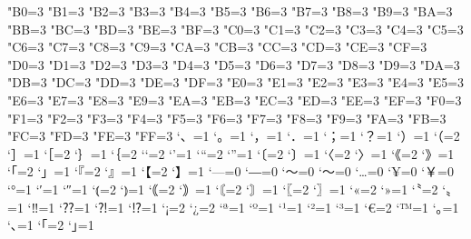 \xspcode"B0=3
\xspcode"B1=3
\xspcode"B2=3
\xspcode"B3=3
\xspcode"B4=3
\xspcode"B5=3
\xspcode"B6=3
\xspcode"B7=3
\xspcode"B8=3
\xspcode"B9=3
\xspcode"BA=3
\xspcode"BB=3
\xspcode"BC=3
\xspcode"BD=3
\xspcode"BE=3
\xspcode"BF=3
\xspcode"C0=3
\xspcode"C1=3
\xspcode"C2=3
\xspcode"C3=3
\xspcode"C4=3
\xspcode"C5=3
\xspcode"C6=3
\xspcode"C7=3
\xspcode"C8=3
\xspcode"C9=3
\xspcode"CA=3
\xspcode"CB=3
\xspcode"CC=3
\xspcode"CD=3
\xspcode"CE=3
\xspcode"CF=3
\xspcode"D0=3
\xspcode"D1=3
\xspcode"D2=3
\xspcode"D3=3
\xspcode"D4=3
\xspcode"D5=3
\xspcode"D6=3
\xspcode"D7=3
\xspcode"D8=3
\xspcode"D9=3
\xspcode"DA=3
\xspcode"DB=3
\xspcode"DC=3
\xspcode"DD=3
\xspcode"DE=3
\xspcode"DF=3
\xspcode"E0=3
\xspcode"E1=3
\xspcode"E2=3
\xspcode"E3=3
\xspcode"E4=3
\xspcode"E5=3
\xspcode"E6=3
\xspcode"E7=3
\xspcode"E8=3
\xspcode"E9=3
\xspcode"EA=3
\xspcode"EB=3
\xspcode"EC=3
\xspcode"ED=3
\xspcode"EE=3
\xspcode"EF=3
\xspcode"F0=3
\xspcode"F1=3
\xspcode"F2=3
\xspcode"F3=3
\xspcode"F4=3
\xspcode"F5=3
\xspcode"F6=3
\xspcode"F7=3
\xspcode"F8=3
\xspcode"F9=3
\xspcode"FA=3
\xspcode"FB=3
\xspcode"FC=3
\xspcode"FD=3
\xspcode"FE=3
\xspcode"FF=3
\inhibitxspcode`、=1
\inhibitxspcode`。=1
\inhibitxspcode`，=1
\inhibitxspcode`．=1
\inhibitxspcode`；=1
\inhibitxspcode`？=1
\inhibitxspcode`）=1
\inhibitxspcode`（=2
\inhibitxspcode`］=1
\inhibitxspcode`［=2
\inhibitxspcode`｝=1
\inhibitxspcode`｛=2
\inhibitxspcode`‘=2
\inhibitxspcode`’=1
\inhibitxspcode`“=2
\inhibitxspcode`”=1
\inhibitxspcode`〔=2
\inhibitxspcode`〕=1
\inhibitxspcode`〈=2
\inhibitxspcode`〉=1
\inhibitxspcode`《=2
\inhibitxspcode`》=1
\inhibitxspcode`「=2
\inhibitxspcode`」=1
\inhibitxspcode`『=2
\inhibitxspcode`』=1
\inhibitxspcode`【=2
\inhibitxspcode`】=1
\inhibitxspcode`—=0%
\inhibitxspcode`―=0%
\inhibitxspcode`〜=0%
\inhibitxspcode`～=0%
\inhibitxspcode`…=0
\inhibitxspcode`¥=0%
\inhibitxspcode`￥=0%
\inhibitxspcode`°=1
\inhibitxspcode`′=1
\inhibitxspcode`″=1
\inhibitxspcode`⦅=2
\inhibitxspcode`⦆=1
\inhibitxspcode`｟=2
\inhibitxspcode`｠=1
\inhibitxspcode`〘=2
\inhibitxspcode`〙=1
\inhibitxspcode`〖=2
\inhibitxspcode`〗=1
\inhibitxspcode`«=2
\inhibitxspcode`»=1
\inhibitxspcode`〝=2
\inhibitxspcode`〟=1
\inhibitxspcode`‼=1
\inhibitxspcode`⁇=1
\inhibitxspcode`⁈=1
\inhibitxspcode`⁉=1
\inhibitxspcode`¡=2
\inhibitxspcode`¿=2
\inhibitxspcode`ª=1
\inhibitxspcode`º=1
\inhibitxspcode`¹=1
\inhibitxspcode`²=1
\inhibitxspcode`³=1
\inhibitxspcode`€=2
\inhibitxspcode`™=1
\inhibitxspcode`｡=1
\inhibitxspcode`､=1
\inhibitxspcode`｢=2
\inhibitxspcode`｣=1
